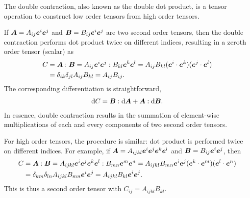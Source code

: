 The double contraction, also known as the double dot product, is a tensor operation to construct low order tensors from high order tensors.

If $\bm{A}=A_{ij}\bm{e}^i\bm{e}^j$ and $\bm{B}=B_{ij}\bm{e}^i\bm{e}^j$ are two second order tensors, then the double contraction performs dot product twice on different indices, resulting in a zeroth order tensor (scalar) as
\begin{gather}\label{eq:double_contraction}
\begin{split}
C&=\bm{A}:\bm{B}=A_{ij}\bm{e}^i\bm{e}^j:B_{kl}\bm{e}^k\bm{e}^l=A_{ij}B_{kl}(\bm{e}^i\cdot\bm{e}^k)(\bm{e}^j\cdot\bm{e}^l)\\&=\delta_{ik}\delta_{jl}A_{ij}B_{kl}=A_{ij}B_{ij}.
\end{split}
\end{gather}
The corresponding differentiation is straightforward,
\begin{gather}
    \mathrm{d}C=\bm{B}:\mathrm{d}\bm{A}+\bm{A}:\mathrm{d}\bm{B}.
\end{gather}
In essence, double contraction results in the summation of element-wise multiplications of each and every components of two second order tensors.

For high order tensors, the procedure is similar: dot product is performed twice on different indices.
For example, if $\bm{A}=A_{ijkl}\bm{e}^i\bm{e}^j\bm{e}^k\bm{e}^l$ and $\bm{B}=B_{ij}\bm{e}^i\bm{e}^j$, then
\begin{gather}
    \begin{split}
        C & =\bm{A}:\bm{B}=A_{ijkl}\bm{e}^i\bm{e}^j\bm{e}^k\bm{e}^l:B_{mn}\bm{e}^m\bm{e}^n=A_{ijkl}B_{mn}\bm{e}^i\bm{e}^j(\bm{e}^k\cdot\bm{e}^m)(\bm{e}^l\cdot\bm{e}^n) \\&=\delta_{km}\delta_{ln}A_{ijkl}B_{mn}\bm{e}^i\bm{e}^j=A_{ijkl}B_{kl}\bm{e}^i\bm{e}^j.
    \end{split}
\end{gather}
This is thus a second order tensor with $C_{ij}=A_{ijkl}B_{kl}$.

